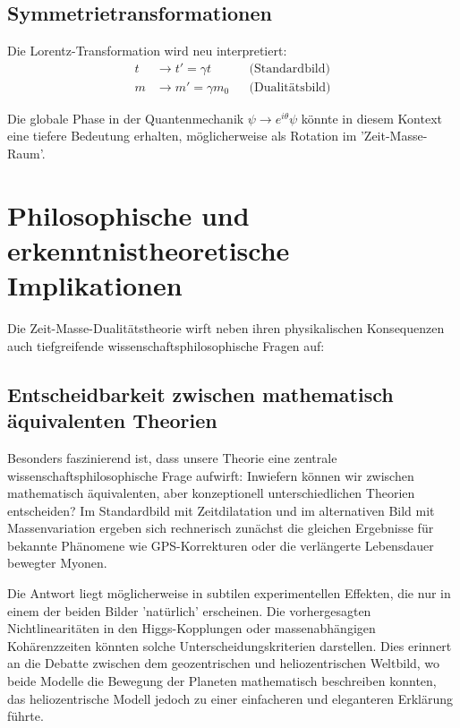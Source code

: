 \documentclass[a4paper,12pt]{article}
\begin{document}
	\subsection{Symmetrietransformationen}
	
	Die Lorentz-Transformation wird neu interpretiert:
	\begin{align}
		t &\to t' = \gamma t & &\text{(Standardbild)} \\
		m &\to m' = \gamma m_0 & &\text{(Dualitätsbild)}
	\end{align}
	
	Die globale Phase in der Quantenmechanik $\psi \to e^{i\theta}\psi$ könnte in diesem Kontext eine tiefere Bedeutung erhalten, möglicherweise als Rotation im 'Zeit-Masse-Raum'.
	
	\section{Philosophische und erkenntnistheoretische Implikationen}
	
	Die Zeit-Masse-Dualitätstheorie wirft neben ihren physikalischen Konsequenzen auch tiefgreifende wissenschaftsphilosophische Fragen auf:
	
	\subsection{Entscheidbarkeit zwischen mathematisch äquivalenten Theorien}
	
	Besonders faszinierend ist, dass unsere Theorie eine zentrale wissenschaftsphilosophische Frage aufwirft: Inwiefern können wir zwischen mathematisch äquivalenten, aber konzeptionell unterschiedlichen Theorien entscheiden? Im Standardbild mit Zeitdilatation und im alternativen Bild mit Massenvariation ergeben sich rechnerisch zunächst die gleichen Ergebnisse für bekannte Phänomene wie GPS-Korrekturen oder die verlängerte Lebensdauer bewegter Myonen.
	
	Die Antwort liegt möglicherweise in subtilen experimentellen Effekten, die nur in einem der beiden Bilder 'natürlich' erscheinen. Die vorhergesagten Nichtlinearitäten in den Higgs-Kopplungen oder massenabhängigen Kohärenzzeiten könnten solche Unterscheidungskriterien darstellen. Dies erinnert an die Debatte zwischen dem geozentrischen und heliozentrischen Weltbild, wo beide Modelle die Bewegung der Planeten mathematisch beschreiben konnten, das heliozentrische Modell jedoch zu einer einfacheren und eleganteren Erklärung führte.
	
\end{document}
